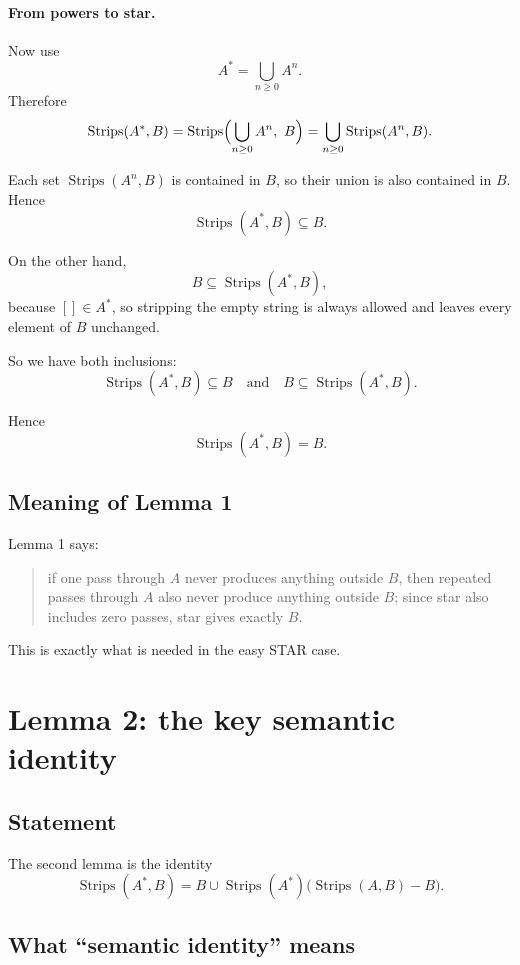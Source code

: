 \documentclass[11pt]{article}
\begin{document}
\paragraph{From powers to star.}
Now use
\[
A^*=\bigcup_{n\ge 0} A^n.
\]
Therefore
\[
\operatorname{Strips}(A^*,B)
=
\operatorname{Strips}\Bigl(\bigcup_{n\ge 0} A^n,\ B\Bigr)
=
\bigcup_{n\ge 0}\operatorname{Strips}(A^n,B).
\]

Each set \(\operatorname{Strips}(A^n,B)\) is contained in \(B\), so their union is also contained in \(B\). Hence
\[
\operatorname{Strips}(A^*,B)\subseteq B.
\]

On the other hand,
\[
B\subseteq \operatorname{Strips}(A^*,B),
\]
because \([]\in A^*\), so stripping the empty string is always allowed and leaves every element of \(B\) unchanged.

So we have both inclusions:
\[
\operatorname{Strips}(A^*,B)\subseteq B
\quad\text{and}\quad
B\subseteq \operatorname{Strips}(A^*,B).
\]

Hence
\[
\operatorname{Strips}(A^*,B)=B.
\]

\subsection*{Meaning of Lemma 1}

Lemma 1 says:

\begin{quote}
if one pass through \(A\) never produces anything outside \(B\), then repeated passes through \(A\) also never produce anything outside \(B\); since star also includes zero passes, star gives exactly \(B\).
\end{quote}

This is exactly what is needed in the easy STAR case.

\section*{Lemma 2: the key semantic identity}

\subsection*{Statement}

The second lemma is the identity
\[
\operatorname{Strips}(A^*,B)
=
B \cup \operatorname{Strips}(A^*)\bigl(\operatorname{Strips}(A,B)-B\bigr).
\tag{$\dagger$}
\]

\subsection*{What ``semantic identity'' means}
\end{document}
